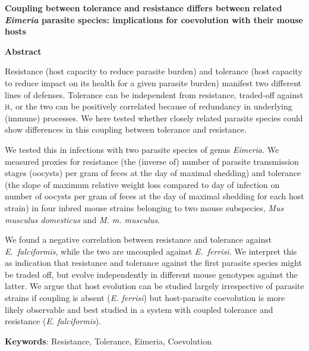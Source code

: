 \documentclass[12pt]{article}
\renewcommand{\_}{\kern-1.5pt\textunderscore\kern-1.5pt}
\begin{document}
\setlength{\parskip}{21.6pt}
{\fontsize{14pt}{16.8pt}\selectfont \textbf{\textcolor[HTML]{00000A}{Coupling between tolerance and resistance differs between related \textit{Eimeria} parasite species: implications for coevolution with their mouse hosts}}\par}\par

\setlength{\parskip}{5.76pt}
{\fontsize{14pt}{16.8pt}\selectfont \textbf{Abstract}\par}\par

Resistance (host capacity to reduce parasite burden) and tolerance (host capacity to reduce impact on its health for a given parasite burden) manifest two different lines of defenses. Tolerance can be independent from resistance, traded-off against it, or the two can be positively correlated because of redundancy in underlying (immune) processes. We here tested whether closely related parasite species could show differences in this coupling between tolerance and resistance. \par

We tested this in infections with two parasite species of genus \textit{Eimeria. }We measured proxies for resistance (the (inverse of) number of parasite transmission stages (oocysts) per gram of feces at the day of maximal shedding) and tolerance (the slope of maximum relative weight loss compared to day of infection on number of oocysts per gram of feces at the day of maximal shedding for each host strain) in four inbred mouse strains belonging to two mouse subspecies, \textit{Mus musculus domesticus} and \textit{M. m. musculus}.\par

We found a negative correlation between resistance and tolerance against \textit{E. falciformis}, while the two are uncoupled against \textit{E. ferrisi.} We interpret this as indication that resistance and tolerance against the first parasite species might be traded off, but evolve independently in different mouse genotypes against the latter. We argue that host evolution can be studied largely irrespective of parasite strains if coupling is absent (\textit{E. ferrisi}) but host-parasite coevolution is more likely observable and best studied in a system with coupled tolerance and resistance (\textit{E. falciformis}). \par

\textbf{Keywords}: Resistance, Tolerance, Eimeria, Coevolution\par
\end{document}
